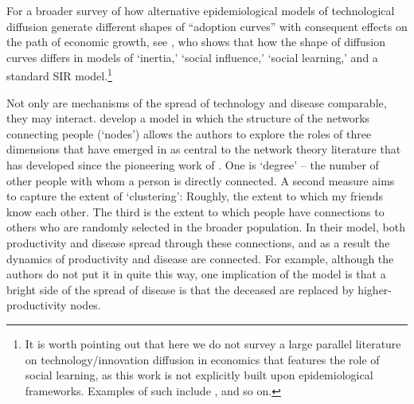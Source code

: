 For a broader survey of how alternative epidemiological models of technological diffusion generate different shapes of  ``adoption curves'' with consequent effects on the path of economic growth, see  \href{https://github.com/iworld1991/EpiExp/blob/master/Literature/young2009innovation.pdf}{\cite{young2009innovation}}, who shows that how the shape of diffusion curves differs in models of `inertia,' `social influence,' `social learning,' and a standard SIR model.\footnote{It is worth pointing out that here we do not survey a large parallel literature on technology/innovation diffusion in economics that features the role of social learning, as this work is not explicitly built upon epidemiological frameworks. Examples of such include  \href{https://www.researchgate.net/publication/222676428_Social_Learning_in_a_Heterogeneous_Population_Technology_Diffusion_in_the_Indian_Green_Revolution}{\cite{munshi2004social}},   \href{https://www.jstor.org/stable/41038754}{\cite{comin2010exploration}} and so on.}  %

Not only are mechanisms of the spread of technology and disease comparable, they may interact.  \href{https://github.com/iworld1991/EpiExp/blob/master/Literature/fogli2012germs.pdf}{\cite{fogli2021germs}} develop a model in which the structure of the networks connecting people (`nodes') allows the authors to explore the roles of three dimensions that have emerged in as central to the network theory literature that has developed since the pioneering work of \cite{erdos1960evolution}.  One is `degree' -- the number of other people with whom a person is directly connected.  A second measure aims to capture the extent of `clustering': Roughly, the extent to which my friends know each other.  The third is the extent to which people have connections to others who are randomly selected in the broader population.  In their model, both productivity and disease spread through these connections, and as a result the dynamics of productivity and disease are connected.  For example, although the authors do not put it in quite this way, one implication of the model is that a bright side of the spread of disease is that the deceased are replaced by higher-productivity nodes.%
